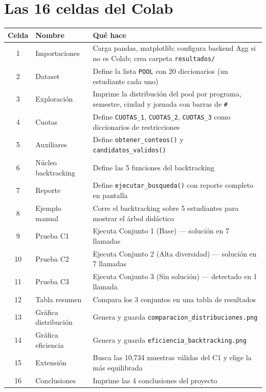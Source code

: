 \documentclass[11pt, a4paper]{article}
\begin{document}
\section{Las 16 celdas del Colab}

\begin{center}
\begin{tabular}{clp{8.5cm}}
  \toprule
  \textbf{Celda} & \textbf{Nombre} & \textbf{Qué hace} \\
  \midrule
  1  & Importaciones        & Carga pandas, matplotlib; configura backend Agg si no es Colab; crea carpeta \texttt{resultados/} \\
  2  & Dataset              & Define la lista \texttt{POOL} con 20 diccionarios (un estudiante cada uno) \\
  3  & Exploración          & Imprime la distribución del pool por programa, semestre, ciudad y jornada con barras de \texttt{\#} \\
  4  & Cuotas               & Define \texttt{CUOTAS\_1}, \texttt{CUOTAS\_2}, \texttt{CUOTAS\_3} como diccionarios de restricciones \\
  5  & Auxiliares           & Define \texttt{obtener\_conteos()} y \texttt{candidatos\_validos()} \\
  6  & Núcleo backtracking  & Define las 5 funciones del backtracking \\
  7  & Reporte              & Define \texttt{ejecutar\_busqueda()} con reporte completo en pantalla \\
  8  & Ejemplo manual       & Corre el backtracking sobre 5 estudiantes para mostrar el árbol didáctico \\
  9  & Prueba C1            & Ejecuta Conjunto 1 (Base) — solución en 7 llamadas \\
  10 & Prueba C2            & Ejecuta Conjunto 2 (Alta diversidad) — solución en 7 llamadas \\
  11 & Prueba C3            & Ejecuta Conjunto 3 (Sin solución) — detectado en 1 llamada \\
  12 & Tabla resumen        & Compara los 3 conjuntos en una tabla de resultados \\
  13 & Gráfica distribución & Genera y guarda \texttt{comparacion\_distribuciones.png} \\
  14 & Gráfica eficiencia   & Genera y guarda \texttt{eficiencia\_backtracking.png} \\
  15 & Extensión            & Busca las 10{,}734 muestras válidas del C1 y elige la más equilibrada \\
  16 & Conclusiones         & Imprime las 4 conclusiones del proyecto \\
  \bottomrule
\end{tabular}
\end{center}
\end{document}
